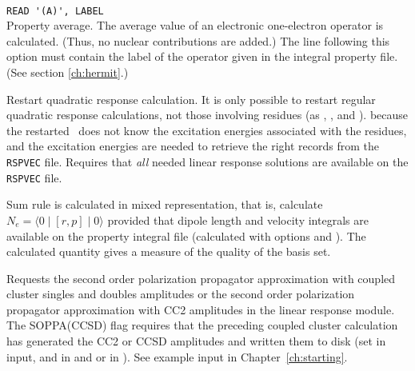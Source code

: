 \begin{description}
\item{} \\
\verb|READ '(A)', LABEL|\\
Property average.
The average value of an electronic one-electron
operator is calculated.
(Thus, no nuclear contributions are added.)
The line following this option must contain the
label of the operator given in the integral property file.
(See section \ref{ch:hermit}.)

\item{}
Restart quadratic response
calculation.
It is only possible to restart regular quadratic response calculations, not those
involving residues (as , , and ).
because the restarted \dalton\ does not know the excitation energies associated with the
residues, and the excitation energies are needed to retrieve the right records from
the \verb|RSPVEC| file.
Requires that {\em all} needed linear response solutions %
are available on the \verb|RSPVEC| file.

\item{}
Sum rule is calculated in mixed representation, that is, calculate
$N_e=\langle0\mid [r,p] \mid0\rangle$ provided that dipole length and
velocity integrals are available on the property integral file
(calculated with  options  and ).
The calculated quantity gives a measure of the quality of the basis
set.

\item{}
Requests the second order polarization propagator approximation with
coupled cluster singles and doubles amplitudes or the second order
polarization propagator approximation with CC2 amplitudes in the linear
response module. The SOPPA(CCSD)
 flag requires that the preceding coupled cluster
calculation has generated the CC2 or CCSD amplitudes and written them
to disk (set  in  input,  and
 in   and 
 or  in ). See example input in
Chapter~\ref{ch:starting}.


\end{description}
